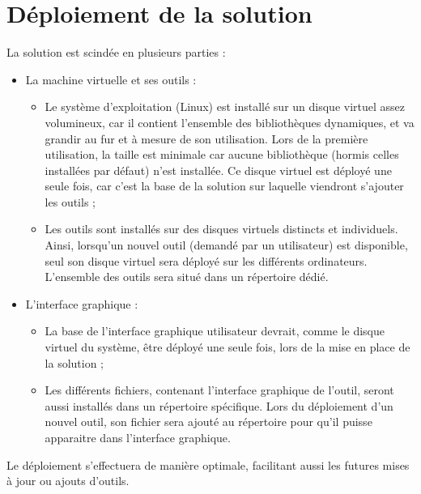 \section{Déploiement de la solution}

La solution est scindée en plusieurs parties :
\begin{itemize}
	\item La machine virtuelle et ses outils :
		\begin{itemize}
			\item Le système d'exploitation (Linux) est installé sur un disque virtuel assez volumineux, car il contient l'ensemble des bibliothèques dynamiques, et va grandir au fur et à mesure de son utilisation.
Lors de la première utilisation, la taille est minimale car aucune bibliothèque (hormis celles installées par défaut) n'est installée.
Ce disque virtuel est déployé une seule fois, car c'est la base de la solution sur laquelle viendront s'ajouter les outils ;
			\item Les outils sont installés sur des disques virtuels distincts et individuels.
Ainsi, lorsqu'un nouvel outil (demandé par un utilisateur) est disponible, seul son disque virtuel sera déployé sur les différents ordinateurs.
L'ensemble des outils sera situé dans un répertoire dédié.
		\end{itemize}
	\item L'interface graphique :
		\begin{itemize}
			\item La base de l'interface graphique utilisateur devrait, comme le disque virtuel du système, être déployé une seule fois, lors de la mise en place de la solution ;
			\item Les différents fichiers, contenant l'interface graphique de l'outil, seront aussi installés dans un répertoire spécifique.
Lors du déploiement d'un nouvel outil, son fichier sera ajouté au répertoire pour qu'il puisse apparaitre dans l'interface graphique.
\\
		\end{itemize}
\end{itemize}


Le déploiement s'effectuera de manière optimale, facilitant aussi les futures mises à jour ou ajouts d'outils.